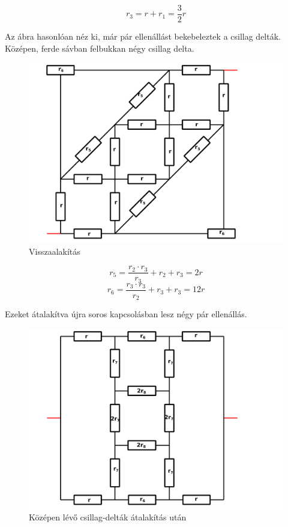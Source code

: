 \documentclass[11pt,a4paper,openany,leqno]{article}
\begin{document}
$$ r_3 = r + r_1 = \frac{3}{2} r $$


Az ábra hasonlóan néz ki, már pár ellenállást bekebeleztek a csillag delták. \\
\newpage
Középen, ferde sávban felbukkan négy csillag delta. \\

\begin{figure}[h!]
\centering
  \includegraphics[width=150mm,scale=0.5]{grid_3_4.pdf}
  \caption{Visszaalakítás}
  \label{}
\end{figure}


$$ r_5 = \frac{r_2 \cdot r_3}{r_3} + r_2 + r_3 = 2r $$
$$ r_6 = \frac{r_3 \cdot r_3}{r_2} + r_3 + r_3 = 12r $$
\newpage

Ezeket átalakítva újra soros kapcsolásban lesz négy pár ellenállás. \\
\begin{figure}[h!]
\centering
  \includegraphics[width=150mm,scale=0.5]{grid_3_5.pdf}
  \caption{Középen lévő csillag-delták átalakítás után}
  \label{}
\end{figure}
\end{document}
